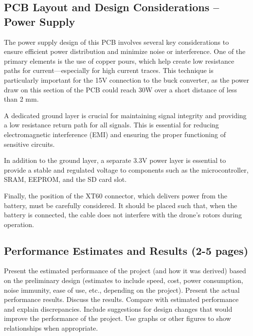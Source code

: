 \documentclass[12pt]{article}
\begin{document}
\subsection{PCB Layout and Design Considerations – Power Supply}
The power supply design of this PCB involves several key considerations to ensure efficient power distribution and minimize noise or interference. One of the primary elements is the use of copper pours, which help create low resistance paths for current—especially for high current traces. This technique is particularly important for the 15V connection to the buck converter, as the power draw on this section of the PCB could reach 30W over a short distance of less than 2 mm.

\par A dedicated ground layer is crucial for maintaining signal integrity and providing a low resistance return path for all signals. This is essential for reducing electromagnetic interference (EMI) and ensuring the proper functioning of sensitive circuits.

\par In addition to the ground layer, a separate 3.3V power layer is essential to provide a stable and regulated voltage to components such as the microcontroller, SRAM, EEPROM, and the SD card slot.

\par Finally, the position of the XT60 connector, which delivers power from the battery, must be carefully considered. It should be placed such that, when the battery is connected, the cable does not interfere with the drone’s rotors during operation.

\subsection{Performance Estimates and Results (2-5 pages)}
Present the estimated performance of the project (and how it was derived) based on the preliminary design (estimates to include speed, cost, power consumption, noise immunity, ease of use, etc., depending on the project). Present the actual performance results. Discuss the results. Compare with estimated performance and explain discrepancies. Include suggestions for design changes that would improve the performance of the project. Use graphs or other figures to show relationships when appropriate.

\end{document}
